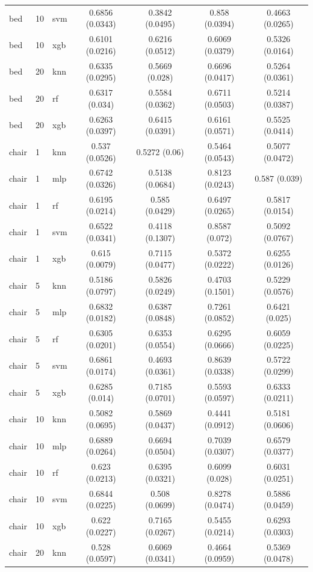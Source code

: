 \begin{table}
\begin{tabular}{lllcccc}
bed & 10 & svm & 0.6856 (0.0343) & 0.3842 (0.0495) & 0.858 (0.0394) & 0.4663 (0.0265) \\
bed & 10 & xgb & 0.6101 (0.0216) & 0.6216 (0.0512) & 0.6069 (0.0379) & 0.5326 (0.0164) \\
bed & 20 & knn & 0.6335 (0.0295) & 0.5669 (0.028) & 0.6696 (0.0417) & 0.5264 (0.0361) \\
bed & 20 & rf & 0.6317 (0.034) & 0.5584 (0.0362) & 0.6711 (0.0503) & 0.5214 (0.0387) \\
bed & 20 & xgb & 0.6263 (0.0397) & 0.6415 (0.0391) & 0.6161 (0.0571) & 0.5525 (0.0414) \\
chair & 1 & knn & 0.537 (0.0526) & 0.5272 (0.06) & 0.5464 (0.0543) & 0.5077 (0.0472) \\
chair & 1 & mlp & 0.6742 (0.0326) & 0.5138 (0.0684) & 0.8123 (0.0243) & 0.587 (0.039) \\
chair & 1 & rf & 0.6195 (0.0214) & 0.585 (0.0429) & 0.6497 (0.0265) & 0.5817 (0.0154) \\
chair & 1 & svm & 0.6522 (0.0341) & 0.4118 (0.1307) & 0.8587 (0.072) & 0.5092 (0.0767) \\
chair & 1 & xgb & 0.615 (0.0079) & 0.7115 (0.0477) & 0.5372 (0.0222) & 0.6255 (0.0126) \\
chair & 5 & knn & 0.5186 (0.0797) & 0.5826 (0.0249) & 0.4703 (0.1501) & 0.5229 (0.0576) \\
chair & 5 & mlp & 0.6832 (0.0182) & 0.6387 (0.0848) & 0.7261 (0.0852) & 0.6421 (0.025) \\
chair & 5 & rf & 0.6305 (0.0201) & 0.6353 (0.0554) & 0.6295 (0.0666) & 0.6059 (0.0225) \\
chair & 5 & svm & 0.6861 (0.0174) & 0.4693 (0.0361) & 0.8639 (0.0338) & 0.5722 (0.0299) \\
chair & 5 & xgb & 0.6285 (0.014) & 0.7185 (0.0701) & 0.5593 (0.0597) & 0.6333 (0.0211) \\
chair & 10 & knn & 0.5082 (0.0695) & 0.5869 (0.0437) & 0.4441 (0.0912) & 0.5181 (0.0606) \\
chair & 10 & mlp & 0.6889 (0.0264) & 0.6694 (0.0504) & 0.7039 (0.0307) & 0.6579 (0.0377) \\
chair & 10 & rf & 0.623 (0.0213) & 0.6395 (0.0321) & 0.6099 (0.028) & 0.6031 (0.0251) \\
chair & 10 & svm & 0.6844 (0.0225) & 0.508 (0.0699) & 0.8278 (0.0474) & 0.5886 (0.0459) \\
chair & 10 & xgb & 0.622 (0.0227) & 0.7165 (0.0267) & 0.5455 (0.0214) & 0.6293 (0.0303) \\
chair & 20 & knn & 0.528 (0.0597) & 0.6069 (0.0341) & 0.4664 (0.0959) & 0.5369 (0.0478) \\

\end{tabular}
\end{table}
